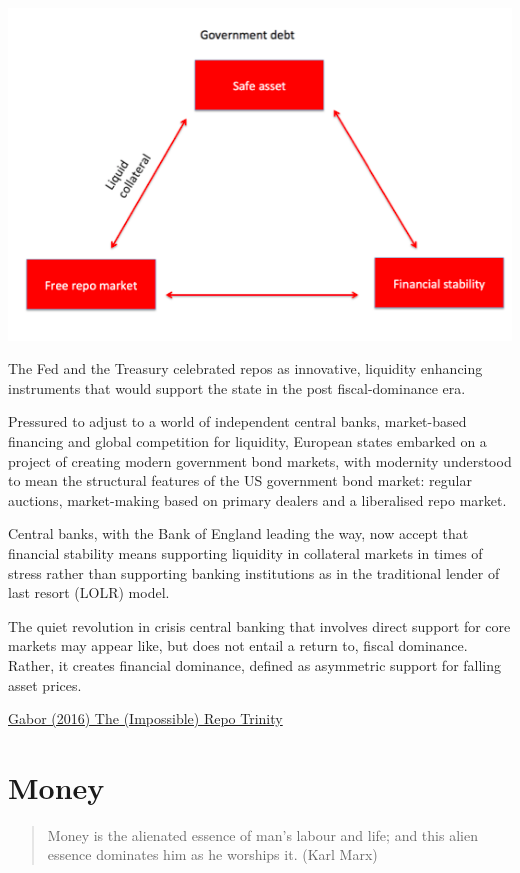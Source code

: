 \documentclass[
]{book}
\begin{document}
\includegraphics{fig/repo_trinity.png}

The Fed and the Treasury celebrated repos as innovative, liquidity enhancing instruments that would support the state in the post fiscal-dominance era.

Pressured to adjust to a world of independent central banks, market-based financing and global competition for liquidity, European states embarked on a project of creating modern government bond markets, with modernity understood to mean the structural features of the US government bond market: regular auctions, market-making based on primary dealers and a liberalised repo market.

Central banks, with the Bank of England leading the way, now accept that financial stability means supporting liquidity in collateral markets in times of stress rather than supporting banking institutions as in the traditional lender of last resort (LOLR) model.

The quiet revolution in crisis central banking that involves direct support for core markets may appear like, but does not entail a return to, fiscal dominance. Rather, it creates financial dominance, defined as asymmetric support for falling asset prices.

\href{https://www.ineteconomics.org/perspectives/blog/the-impossible-repo-trinity}{Gabor (2016) The (Impossible) Repo Trinity}

\hypertarget{money-1}{%
\chapter{Money}\label{money-1}}

\begin{quote}
Money is the alienated essence of man's labour and life; and this alien essence dominates him as he worships it. (Karl Marx)
\end{quote}
\end{document}
